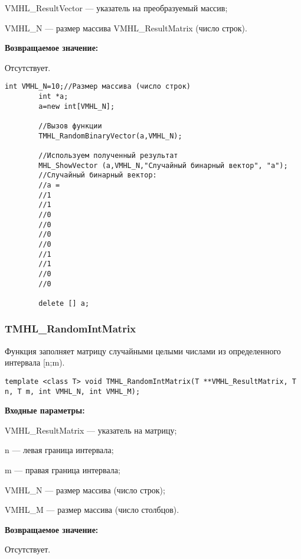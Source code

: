 \documentclass[a4paper,12pt]{article}
\begin{document}
VMHL\_ResultVector --- указатель на преобразуемый массив;
 
VMHL\_N --- размер массива VMHL\_ResultMatrix (число строк).

\textbf{Возвращаемое значение:}

Отсутствует.


\begin{lstlisting}[label=code_use_TMHL_RandomBinaryVector,caption=Пример использования]
        int VMHL_N=10;//Размер массива (число строк)
        int *a;
        a=new int[VMHL_N];

        //Вызов функции
        TMHL_RandomBinaryVector(a,VMHL_N);

        //Используем полученный результат
        MHL_ShowVector (a,VMHL_N,"Случайный бинарный вектор", "a");
        //Случайный бинарный вектор:
        //a =
        //1
        //1
        //0
        //0
        //0
        //0
        //1
        //1
        //0
        //0

        delete [] a;
\end{lstlisting}

\subsubsection{TMHL\_RandomIntMatrix}\label{TMHL_RandomIntMatrix}

Функция заполняет матрицу случайными целыми числами из определенного интервала [n;m).


\begin{lstlisting}[label=code_syntax_TMHL_RandomIntMatrix,caption=Синтаксис]
template <class T> void TMHL_RandomIntMatrix(T **VMHL_ResultMatrix, T n, T m, int VMHL_N, int VMHL_M);
\end{lstlisting}

\textbf{Входные параметры:}
 
VMHL\_ResultMatrix --- указатель на матрицу;
 
n --- левая граница интервала;
 
m --- правая граница интервала;
 
VMHL\_N --- размер массива (число строк);
 
VMHL\_M --- размер массива (число столбцов).

\textbf{Возвращаемое значение:}

Отсутствует.
\end{document}
